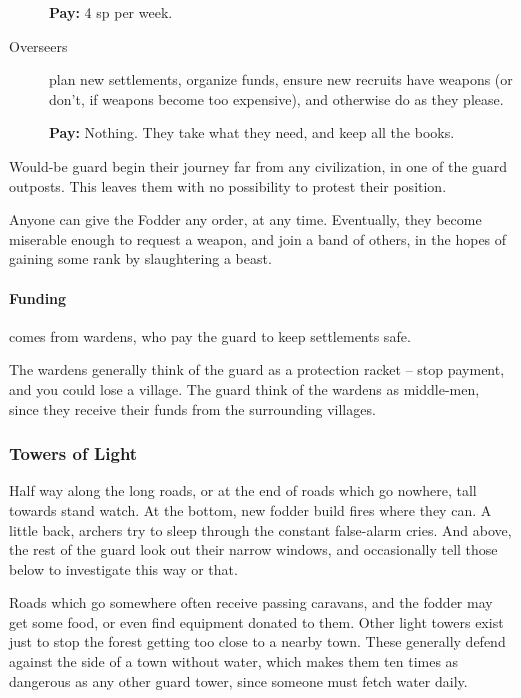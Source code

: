 \begin{multicols}{2}
\begin{description}
  \textbf{Pay:} 4 \gls{sp} per week.

  \item[Overseers]
  plan new settlements, organize funds, ensure new recruits have weapons (or don't, if weapons become too expensive), and otherwise do as they please.

  \textbf{Pay:} Nothing.
  They take what they need, and keep all the books.

\end{description}

\noindent
Would-be \gls{guard} begin their journey far from any civilization, in one of the \gls{guard} outposts.
This leaves them with no possibility to protest their position.

Anyone can give the Fodder any order, at any time.
Eventually, they become miserable enough to request a weapon, and join a band of others, in the hopes of gaining some rank by slaughtering a beast.

\paragraph{Funding}
comes from wardens, who pay the guard to keep settlements safe.

The wardens generally think of the \gls{guard} as a protection racket -- stop payment, and you could lose a village.
The \gls{guard} think of the wardens as middle-men, since they receive their funds from the surrounding villages.

\subsubsection{Towers of Light}
Half way along the long roads, or at the end of roads which go nowhere, tall towards stand watch.
At the bottom, new fodder build fires where they can.
A little back, archers try to sleep through the constant false-alarm cries.
And above, the rest of the guard look out their narrow windows, and occasionally tell those below to investigate this way or that.

Roads which go somewhere often receive passing caravans, and the fodder may get some food, or even find equipment donated to them.
Other light towers exist just to stop the forest getting too close to a nearby town.
These generally defend against the side of a town without water, which makes them ten times as dangerous as any other \gls{guard} tower, since someone must fetch water daily.


\end{multicols}
